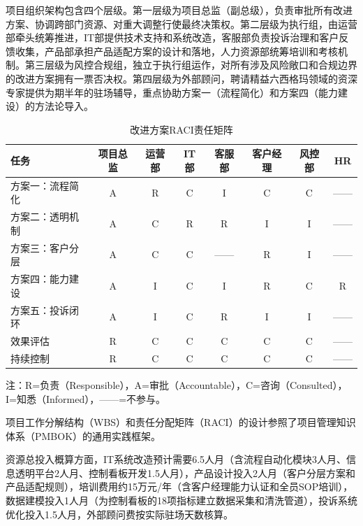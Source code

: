 项目组织架构包含四个层级。第一层级为项目总监（副总级），负责审批所有改进方案、协调跨部门资源、对重大调整行使最终决策权。第二层级为执行组，由运营部牵头统筹推进，IT部提供技术支持和系统改造，客服部负责投诉治理和客户反馈收集，产品部承担产品适配方案的设计和落地，人力资源部统筹培训和考核机制。第三层级为风控合规组，独立于执行组运作，对所有涉及风险敞口和合规边界的改进方案拥有一票否决权。第四层级为外部顾问，聘请精益六西格玛领域的资深专家提供为期半年的驻场辅导，重点协助方案一（流程简化）和方案四（能力建设）的方法论导入。

\begin{landscape}
\begin{table}[htbp]
  \centering
  \small
  \caption{改进方案RACI责任矩阵}
  \label{tab:6-2}
  \begin{tabularx}{\textwidth}{X c c c c c c c}
    \toprule
    \textbf{任务} & \textbf{项目总监} & \textbf{运营部} & \textbf{IT部} & \textbf{客服部} & \textbf{客户经理} & \textbf{风控部} & \textbf{HR} \\
    \midrule
    方案一：流程简化 & A & R & C & I & C & C & —— \\
    方案二：透明机制 & A & C & R & R & I & I & —— \\
    方案三：客户分层 & A & C & C & —— & R & I & —— \\
    方案四：能力建设 & A & I & C & I & R & C & R \\
    方案五：投诉闭环 & A & I & C & R & I & I & —— \\
    效果评估 & R & C & C & C & C & C & —— \\
    持续控制 & R & C & C & C & C & C & —— \\
    \bottomrule
  \end{tabularx}
  \par\vspace{4pt}
  {\footnotesize 注：R=负责（Responsible），A=审批（Accountable），C=咨询（Consulted），I=知悉（Informed），——=不参与。}
\end{table}
\end{landscape}

项目工作分解结构（WBS）和责任分配矩阵（RACI）的设计参照了项目管理知识体系（PMBOK）的通用实践框架\cite{ref68}。

资源总投入概算方面，IT系统改造预计需要6.5人月（含流程自动化模块3人月、信息透明平台2人月、控制看板开发1.5人月），产品设计投入2人月（客户分层方案和产品适配规则），培训费用约15万元/年（含客户经理能力认证和全员SOP培训），数据建模投入1人月（为控制看板的18项指标建立数据采集和清洗管道），投诉系统优化投入1.5人月，外部顾问费按实际驻场天数核算。

